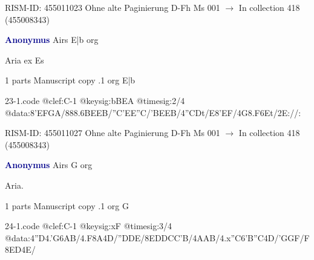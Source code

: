 \documentclass[twocolumn]{book}
\begin{document}
\newline RISM-ID: 455011023
\newline Ohne alte Paginierung
\newline D-Fh  Ms 001
\newline $\rightarrow$ In collection 418 (455008343)

\newline \par \vspace{7pt} \textcolor{darkblue}{\textbf{Anonymus  }}
\newline Airs  E|b  
\newline org
\newline \begin{itshape}[f.117v, heading:] Aria ex Es\end{itshape} 
\newline \textcolor{darkblue}{}  1 parts  
\newline Manuscript copy
.1  org  E|b  
\begin{filecontents*}{23-1.code}
@clef:C-1
@keysig:bBEA
@timesig:2/4
@data:{8'EF}{GA}/888.6{BE}{EB}/{''C'E}{E''C}/{'BE}{EB}/4''CDt/E{8'EF}/4G{8.F6Et}/2E://:
\end{filecontents*}
\newline
%

\newline RISM-ID: 455011027
\newline Ohne alte Paginierung
\newline D-Fh  Ms 001
\newline $\rightarrow$ In collection 418 (455008343)

\newline \par \vspace{7pt} \textcolor{darkblue}{\textbf{Anonymus  }}
\newline Airs  G  
\newline org
\newline \begin{itshape}[f.118v, heading:] Aria.\end{itshape} 
\newline \textcolor{darkblue}{}  1 parts  
\newline Manuscript copy
.1  org  G  
\begin{filecontents*}{24-1.code}
@clef:C-1
@keysig:xF
@timesig:3/4
@data:4''D4.'G{6AB}/4.F8A4D/''DDE/{8EDDCC'B}/4AAB/4.x''C{6'B''C}4D/'GGF/F{8ED}4E/
\end{filecontents*}
\newline
%
\end{document}
